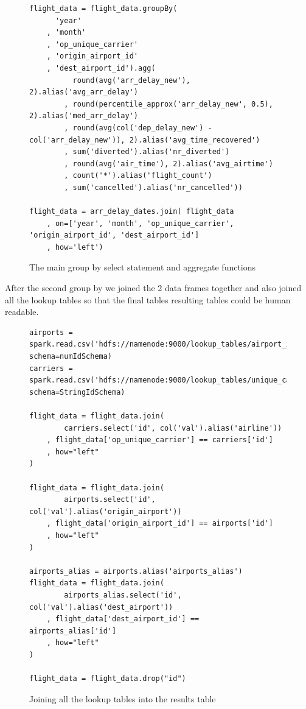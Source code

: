 \begin{figure}[H]
\centering
\begin{lstlisting}
flight_data = flight_data.groupBy(
      'year'
    , 'month'
    , 'op_unique_carrier'
    , 'origin_airport_id'
    , 'dest_airport_id').agg( 
          round(avg('arr_delay_new'), 2).alias('avg_arr_delay')
        , round(percentile_approx('arr_delay_new', 0.5), 2).alias('med_arr_delay')
        , round(avg(col('dep_delay_new') - col('arr_delay_new')), 2).alias('avg_time_recovered')
        , sum('diverted').alias('nr_diverted')
        , round(avg('air_time'), 2).alias('avg_airtime')
        , count('*').alias('flight_count')
        , sum('cancelled').alias('nr_cancelled'))

flight_data = arr_delay_dates.join( flight_data
    , on=['year', 'month', 'op_unique_carrier', 'origin_airport_id', 'dest_airport_id']
    , how='left')
\end{lstlisting}
\caption{The main group by select statement and aggregate functions}
\label{fig:groupby}
\end{figure}

After the second group by we joined the 2 data frames together and also joined all the lookup tables so that the final tables resulting tables could be human readable.

\begin{figure}[H]
\centering
\begin{lstlisting}
airports = spark.read.csv('hdfs://namenode:9000/lookup_tables/airport_id.csv', schema=numIdSchema)
carriers = spark.read.csv('hdfs://namenode:9000/lookup_tables/unique_carrier.csv', schema=StringIdSchema)

flight_data = flight_data.join(
		carriers.select('id', col('val').alias('airline'))
	, flight_data['op_unique_carrier'] == carriers['id']
	, how="left"
)

flight_data = flight_data.join(
		airports.select('id', col('val').alias('origin_airport'))
	, flight_data['origin_airport_id'] == airports['id']
	, how="left"
)

airports_alias = airports.alias('airports_alias')
flight_data = flight_data.join(
		airports_alias.select('id', col('val').alias('dest_airport'))
	, flight_data['dest_airport_id'] == airports_alias['id']
	, how="left"
)

flight_data = flight_data.drop("id")
\end{lstlisting}
\caption{Joining all the lookup tables into the results table}
\label{fig:lookup_joins}
\end{figure}


